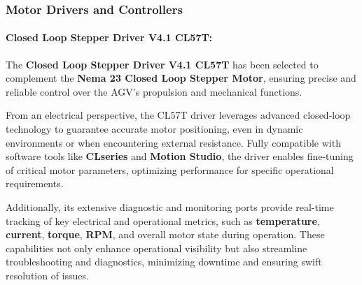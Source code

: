 \documentclass[../../main]{subfiles}
\begin{document}
\subsubsection{Motor Drivers and Controllers}


\paragraph{Closed Loop Stepper Driver V4.1 CL57T:}

The \textbf{Closed Loop Stepper Driver V4.1 CL57T} has been selected 
to complement the \textbf{Nema 23 Closed Loop Stepper Motor}, 
ensuring precise and reliable control over the AGV's propulsion and mechanical functions. 

From an electrical perspective, the CL57T driver leverages 
advanced closed-loop technology to guarantee accurate motor positioning, 
even in dynamic environments or when encountering external resistance. 
Fully compatible with software tools like \textbf{CLseries} and \textbf{Motion Studio}, 
the driver enables fine-tuning of critical motor parameters, optimizing performance 
for specific operational requirements. 

Additionally, its extensive diagnostic and monitoring ports provide 
real-time tracking of key electrical and operational metrics, 
such as \textbf{temperature}, \textbf{current}, \textbf{torque}, \textbf{RPM}, 
and overall motor state during operation. These capabilities not only enhance operational 
visibility but also streamline troubleshooting and diagnostics, minimizing downtime and ensuring swift resolution of issues. 




    
\end{document}
